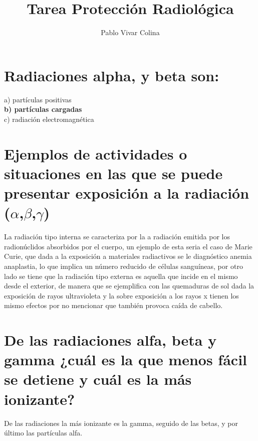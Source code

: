 \documentclass[]{article}
\title{Tarea Protección Radiológica}
\author{Pablo Vivar Colina}
\begin{document}
	

\maketitle




\section{Radiaciones alpha, y beta son:}

a) partículas positivas\\
\textbf{b) partículas cargadas}\\
c) radiación electromagnética\\

\section{Ejemplos de actividades o situaciones en las que se puede presentar exposición a la radiación ($\alpha$,$\beta$,$\gamma$)}


La radiación tipo interna se caracteriza por la a radiación emitida por los radionúclidos absorbidos
por el cuerpo, un ejemplo de esta seria el caso de Marie Curie, que dada a la exposición a
materiales radiactivos se le diagnóstico anemia anaplastia, lo que implica un número reducido de
células sanguíneas, por otro lado se tiene que la radiación tipo externa es aquella que incide en el
mismo desde el exterior, de manera que se ejemplifica con las quemaduras de sol dada la
exposición de rayos ultravioleta y la sobre exposición a los rayos x tienen los mismo efectos por
no mencionar que también provoca caída de cabello.\\


\section{De las radiaciones alfa, beta y gamma ¿cuál es la que menos fácil se detiene y cuál es la más ionizante?}

De las radiaciones la más ionizante es la gamma, seguido de las betas, y por último las partículas alfa.\\
\end{document}

